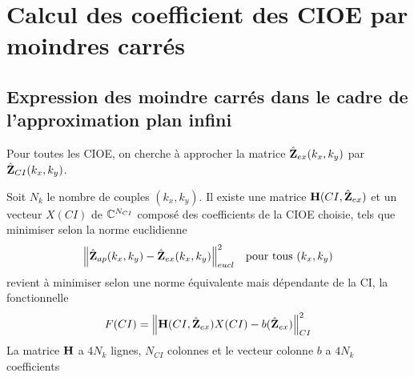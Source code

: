 \section{Calcul des coefficient des CIOE par moindres carrés}


\subsection{Expression des moindre carrés dans le cadre de l'approximation plan infini}
  Pour toutes les CIOE, on cherche à approcher la matrice \(\hat{\mathbf{Z}}_{ex}(k_x,k_y)\) par \(\hat{\mathbf{Z}}_{CI}(k_x,k_y)\). 

  \begin{prop}
    Soit \(N_k\) le nombre de couples \((k_x,k_y)\).
    Il existe une matrice \(\mathbf{H}(CI,\hat{\mathbf{Z}}_{ex})\) et un vecteur \(X(CI)\) de \(\mathbb C^{N_{CI}}\) composé des coefficients de la CIOE choisie, tels que minimiser selon la norme euclidienne
    \begin{align*}
      \left\lVert \hat{\mathbf{Z}}_{ap}(k_x,k_y)-\hat{\mathbf{Z}}_{ex}(k_x,k_y)\right\rVert^2_{eucl} & & \text{pour tous \((k_x,k_y)\)}
    \end{align*}
    revient à minimiser selon une norme équivalente mais dépendante de la CI, la fonctionnelle
    \[ 
      F(CI) = \left\lVert  \mathbf{H}(CI,\hat{\mathbf{Z}}_{ex}) X(CI) - b(\hat{\mathbf{Z}}_{ex}) \right\rVert^2_{CI}
    \]
    La matrice \(\mathbf{H}\) a \(4N_{k}\) lignes, \(N_{CI}\) colonnes et le vecteur colonne \(b\) a \(4N_{k}\) coefficients
  \end{prop}

